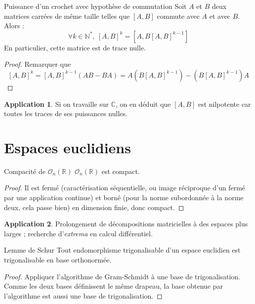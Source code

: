\documentclass[french]{article}
\newcommand{\N}{\mathbb{N}}
\newcommand{\R}{\mathbb{R}}
\newcommand{\C}{\mathbb{C}}
\newcommand{\st}{^*}
\theoremstyle{theorem}
\theoremstyle{definition}
\newtheorem*{app}{Application}
\begin{document}
\begin{lem}{Puissance d'un crochet avec hypothèse de commutation}
	Soit $A$ et $B$ deux matrices carrées de même taille telles que $[A,B]$ commute avec $A$ et avec $B$. Alors : $$\forall k\in\N\st,\ [A,B]^k=\left[A,B[A,B]^{k-1}\right]$$ En particulier, cette matrice est de trace nulle.
\end{lem}
\begin{proof}
	Remarquer que $$[A,B]^k=[A,B]^{k-1}(AB-BA)=A(B[A,B]^{k-1})-(B[A,B]^{k-1})A$$
\end{proof}
\begin{app}
	Si on travaille sur $\C$, on en déduit que $[A,B]$ est nilpotente car toutes les traces de ses puissances nulles. 
\end{app}

\section{Espaces euclidiens}

\begin{lem}{Compacité de $\mathcal{O}_n(\R)$}
	$\mathcal{O}_n(\R)$ est compact.
\end{lem}
\begin{proof}
	Il est fermé (caractérisation séquentielle, ou image réciproque d'un fermé par une application continue) et borné (pour la norme subordonnée à la norme deux, cela passe bien) en dimension finie, donc compact.
\end{proof}
\begin{app}
	Prolongement de décompositions matricielles à des espaces plus larges ; recherche d'\textit{extrema} en calcul différentiel.
\end{app}

\begin{lem}{Lemme de Schur}
	Tout endomorphisme trigonalisable d'un espace euclidien est trigonalisable en base orthonormée.
\end{lem}
\begin{proof}
	Appliquer l'algorithme de Gram-Schmidt à une base de trigonalisation. Comme les deux bases définissent le même drapeau, la base obtenue par l'algorithme est aussi une base de trigonalisation.
\end{proof}
\end{document}
